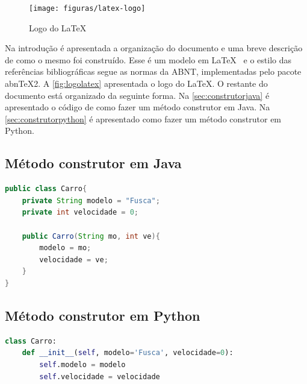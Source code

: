 \documentclass[11pt]{../../classes/ifscarticle}
\begin{document}
\lipsum[1]

\begin{figure}[ht]
    \centering
    \texttt{[image: figuras/latex-logo]}
    \caption{Logo do \LaTeX}
    \label{fig:logolatex}
\end{figure}

Na introdução é apresentada a organização do documento e uma breve descrição de como o mesmo foi construído.   Esse é um modelo em \LaTeX~ \cite{lamport94} e o estilo das referências bibliográficas segue as normas da ABNT, implementadas pelo pacote abnTeX2. A \autoref{fig:logolatex} apresentada o logo do \LaTeX. O restante do documento está organizado da seguinte forma. Na \autoref{sec:construtorjava} é apresentado o código de como fazer um método construtor em Java. Na \autoref{sec:construtorpython} é apresentado como fazer um método construtor em Python.

\subsection{Método construtor em Java}
\label{sec:construtorjava}


\begin{lstlisting}[language=java]
public class Carro{
    private String modelo = "Fusca";
    private int velocidade = 0;
    
    public Carro(String mo, int ve){
        modelo = mo;
        velocidade = ve;
    }
}
\end{lstlisting}


\subsection{Método construtor em Python}
\label{sec:construtorpython}


\begin{lstlisting}[language=python]
class Carro:
    def __init__(self, modelo='Fusca', velocidade=0):
        self.modelo = modelo
        self.velocidade = velocidade
\end{lstlisting}







\end{document}
